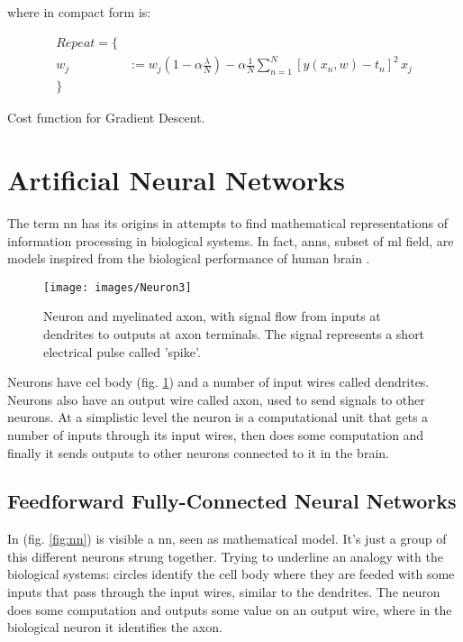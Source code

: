 \noindent where in compact form is:
\begin{Equation}[H]
	\centering
	\begin{equation} \label{eq:graddesccompact}
	\begin{aligned}
		Repeat = \{ \\
			w_j &:= w_j(1-\alpha \frac{\lambda}{N}) - \alpha \frac{1}{N} \sum_{n=1}^{N} [ y(x_n,w)-t_n ]^2 \, x_j \\
		\}
	\end{aligned}
	\end{equation}
	\caption[Cost function for Gradient Descent.]{Cost function for Gradient Descent.}
\end{Equation}



\section{Artificial Neural Networks}
\label{sec:nn}
The term  \gls{nn} has its origins in attempts to find mathematical representations of information processing in biological systems. In fact, \glspl{ann}, subset of \gls{ml} field, are models inspired from the biological performance of human brain \cite[]{inbook}. 

\begin{figure}[H]
	\centering
	\texttt{[image: images/Neuron3]}
	\caption[Image of a human neuron.]{Neuron and myelinated axon, with signal flow from inputs at dendrites to outputs at axon terminals. The signal represents a short electrical pulse called 'spike'.}
	\label{fig:bioneuron}
\end{figure}

\noindent Neurons have cel body (fig. \ref{fig:bioneuron}) and a number of input wires called dendrites. Neurons also have an output wire called axon, used to send signals to other neurons. At a simplistic level the neuron is a computational unit that gets a number of inputs through its input wires, then does some computation and finally it sends outputs to other neurons connected to it in the brain. \\

\subsection{Feedforward Fully-Connected Neural Networks}
\label{nn:feedforward}

\noindent In (fig. \ref{fig:nn}) is visible a \gls{nn}, seen as mathematical model. It's just a group of this different neurons strung together. Trying to underline an analogy with the biological systems: circles identify the cell body where they are feeded with some inputs that pass through the input wires, similar to the dendrites. The neuron does some computation and outputs some value on an output wire, where in the biological neuron it identifies the axon.

